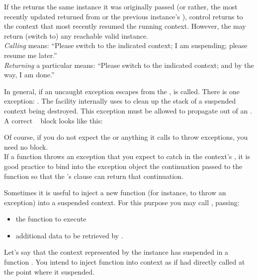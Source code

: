 If the \entryfn returns the same \cont instance it was originally
passed (or rather, the most recently updated \cont returned from \callcc or the
previous instance's \resume), control returns to the context that most
recently resumed the running context. However, the \entryfn may return (switch
to) any reachable valid \cont instance.\\

\emph{Calling} \contresume means: ``Please switch to the indicated context; I
am suspending; please resume me later.''\\

\emph{Returning} a particular \cont means: ``Please switch to the indicated
context; and by the way, I am done.''


\label{subsec:exceptions}

In general, if an uncaught exception escapes from the \entryfn,
 is called. There is one exception: \unwindex. The \callcc
facility internally uses \unwindex to clean up the stack of a suspended context
being destroyed. This exception must be allowed to propagate out of an \entryfn.\\

A correct \entryfn\  block looks like this:

Of course, if you do not expect the \entryfn or anything it calls to throw
exceptions, you need no  block.\\

If a \resumewith function throws an exception that you expect to catch in the
context's \entryfn, it is good practice to bind into the exception object the
continuation passed to the \resumewith function so that
the \entryfn's  clause can return that continuation.


\label{subsec:resumewith}

Sometimes it is useful to inject a new function (for instance, to throw an
exception) into a suspended context. For this purpose you may call
, passing:

\begin{itemize}
    \item the function  to execute
    \item additional data  to be retrieved by .
\end{itemize}

Let's say that the context represented by the \cont instance  has
suspended in a function . You intend to inject function
 into context  as if  had directly called
 at the point where it suspended.\\

